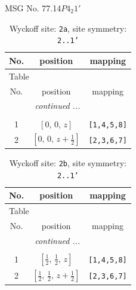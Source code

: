\documentclass[fleqn,8pt]{jsarticle}
\begin{document}
\setcounter{MaxMatrixCols}{32}

\renewcommand{\tablename}{Table~}
\renewcommand{\figurename}{Figure~}
\begin{center}
\LARGE
MSG No. 77.14\quad$P4_{2}1'$
\end{center}
\renewcommand{\arraystretch}{1.2}
\begin{longtable}{ccc}
\caption{Wyckoff site: {\tt 2a}, site symmetry: {\tt 2..1'}}
 \\
 \hline \hline
No. & position & mapping \\ \hline \endfirsthead

\multicolumn{2}{l}{\tablename\ \thetable{}} \\
 \hline \hline
No. & position & mapping \\ \hline \endhead

 \hline \hline
\multicolumn{2}{r}{\footnotesize\it continued ...} \\ \endfoot

 \hline \hline
\multicolumn{2}{r}{} \\ \endlastfoot

1 & $\left[ 0,\, 0,\, z \right]$ & {\tt [1,4,5,8]} \\ \hline
2 & $\left[ 0,\, 0,\, z + \frac{1}{2} \right]$ & {\tt [2,3,6,7]} \\
\end{longtable}
\renewcommand{\arraystretch}{1.2}
\begin{longtable}{ccc}
\caption{Wyckoff site: {\tt 2b}, site symmetry: {\tt 2..1'}}
 \\
 \hline \hline
No. & position & mapping \\ \hline \endfirsthead

\multicolumn{2}{l}{\tablename\ \thetable{}} \\
 \hline \hline
No. & position & mapping \\ \hline \endhead

 \hline \hline
\multicolumn{2}{r}{\footnotesize\it continued ...} \\ \endfoot

 \hline \hline
\multicolumn{2}{r}{} \\ \endlastfoot

1 & $\left[ \frac{1}{2},\, \frac{1}{2},\, z \right]$ & {\tt [1,4,5,8]} \\ \hline
2 & $\left[ \frac{1}{2},\, \frac{1}{2},\, z + \frac{1}{2} \right]$ & {\tt [2,3,6,7]} \\
\end{longtable}
\end{document}
